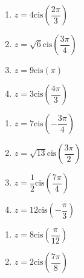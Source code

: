 \begin{multicols}{4} 

\begin{enumerate}

\setcounter{enumi}{\value{HW}}

\item $z = 4\text{cis}\left(\dfrac{2\pi}{3}\right)$ 
\item $z = \sqrt{6}\text{cis}\left(\dfrac{3\pi}{4}\right)$ 
\item $z = 9\text{cis}\left(\pi\right)$ 
\item $z = 3\text{cis}\left(\dfrac{4\pi}{3}\right)$

\setcounter{HW}{\value{enumi}}

\end{enumerate}

\end{multicols}

\begin{multicols}{4} 

\begin{enumerate}

\setcounter{enumi}{\value{HW}}

\item $z = 7\text{cis}\left(-\dfrac{3\pi}{4}\right)$ 
\item \small $z = \sqrt{13}\text{cis}\left(\dfrac{3\pi}{2}\right)$ \normalsize
\item $z = \dfrac{1}{2}\text{cis}\left(\dfrac{7\pi}{4}\right)$ 
\item $z = 12\text{cis}\left(-\dfrac{\pi}{3}\right)$ 

\setcounter{HW}{\value{enumi}}

\end{enumerate}

\end{multicols}

\begin{multicols}{2} 

\begin{enumerate}

\setcounter{enumi}{\value{HW}}

\item $z = 8\text{cis}\left(\dfrac{\pi}{12}\right)$ 
\item $z = 2\text{cis}\left(\dfrac{7\pi}{8}\right)$ 

\setcounter{HW}{\value{enumi}}

\end{enumerate}

\end{multicols}

